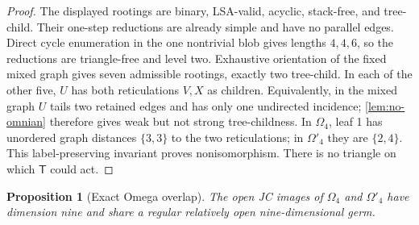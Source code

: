 \documentclass[11pt]{article}
\newtheorem{proposition}[theorem]{Proposition}
\theoremstyle{remark}
\newcommand{\Tmove}{\mathsf T}
\begin{document}
\begin{proof}
The displayed rootings are binary, LSA-valid, acyclic, stack-free, and
tree-child.  Their one-step reductions are already simple and have no
parallel edges.  Direct cycle enumeration in the one nontrivial blob gives
lengths $4,4,6$, so the reductions are triangle-free and level two.  Exhaustive
orientation of the fixed mixed graph gives seven admissible rootings, exactly
two tree-child.  In each of the other five, $U$ has both reticulations $V,X$
as children.  Equivalently, in the mixed graph $U$ tails two retained edges
and has only one undirected incidence; \cref{lem:no-omnian} therefore gives
weak but not strong tree-childness.  In $\Omega_4$, leaf 1 has unordered graph distances
$\{3,3\}$ to the two reticulations; in $\Omega'_4$ they are $\{2,4\}$.
This label-preserving invariant proves nonisomorphism.  There is no triangle
on which $\Tmove$ could act.
\end{proof}

\begin{proposition}[Exact Omega overlap]\label{prop:omega-overlap}
The open JC images of $\Omega_4$ and $\Omega'_4$ have dimension nine and
share a regular relatively open nine-dimensional germ.
\end{proposition}
\end{document}
